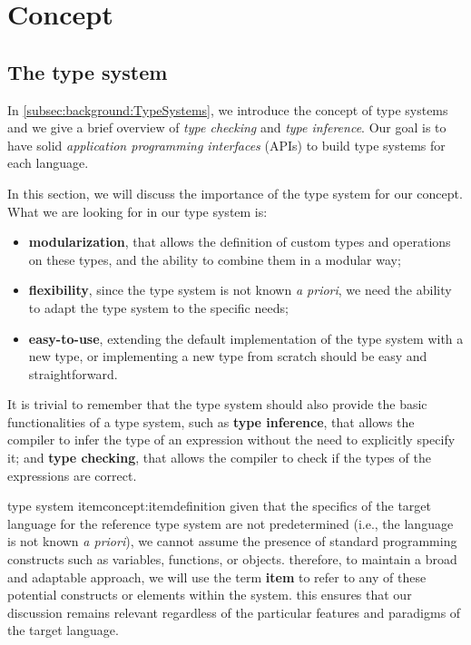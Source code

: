 \chapter{Concept}\label{chap:Concept}

\section{The type system}\label{sec:concept:TheTypeSystem}

In \ref{subsec:background:TypeSystems}, we introduce the concept of type systems and we give a brief overview of \textit{type checking} and \textit{type inference}. Our goal is to have solid \textit{application programming interfaces} (APIs) to build type systems for each language.

In this section, we will discuss the importance of the type system for our concept.
What we are looking for in our type system is:
\begin{itemize}
    \item \textbf{modularization}, that allows the definition of custom types and operations on these types, and the ability to combine them in a modular way;
    \item \textbf{flexibility}, since the type system is not known \textit{a priori}, we need the ability to adapt the type system to the specific needs;
    \item \textbf{easy-to-use}, extending the default implementation of the type system with a new type, or implementing a new type from scratch should be easy and straightforward.
\end{itemize}

It is trivial to remember that the type system should also provide the basic functionalities of a type system, such as \textbf{type inference}, that allows the compiler to infer the type of an expression without the need to explicitly specify it; and \textbf{type checking}, that allows the compiler to check if the types of the expressions are correct.


\begin{mydefinition}{type system item}{concept:itemdefinition}
    given that the specifics of the target language for the reference type system are not predetermined (i.e., the language is not known \textit{a priori}), we cannot assume the presence of standard programming constructs such as variables, functions, or objects. therefore, to maintain a broad and adaptable approach, we will use the term \textbf{item} to refer to any of these potential constructs or elements within the system. this ensures that our discussion remains relevant regardless of the particular features and paradigms of the target language.
\end{mydefinition}

